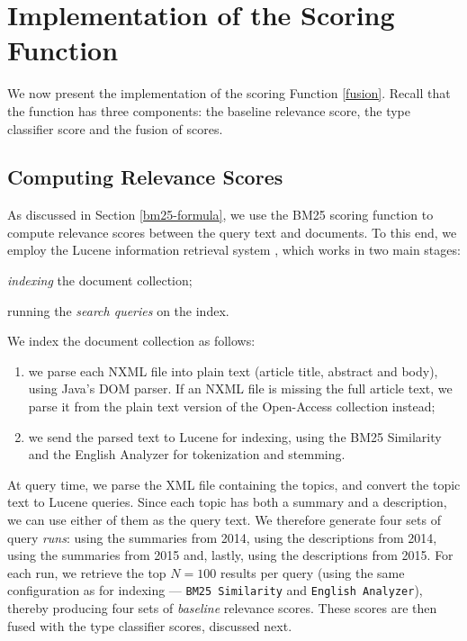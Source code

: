 \section{Implementation of the Scoring Function}
We now present the implementation of the scoring Function \ref{fusion}. Recall that the function has three components:
the baseline relevance score, the type classifier score and the fusion of scores.

\subsection{Computing Relevance Scores}\label{sim-impl}
As discussed in Section \ref{bm25-formula}, we use the \textsf{BM25} scoring function to compute relevance scores between the query
text and documents. To this end, we employ the Lucene information retrieval system \cite{lucene}, which works in two main stages:
\begin{enumerate*}[label=\arabic*)]
 \item \emph{indexing} the document collection;
 \item running the \emph{search queries} on the index.
\end{enumerate*}

We index the document collection as follows:
\begin{enumerate}[label=\arabic*)]
 \item we parse each NXML file into plain text (article title, abstract and body), using Java's DOM parser.
  If an NXML file is missing the full article text, we parse it from the plain text version of the Open-Access collection instead;
 \item we send the parsed text to Lucene for indexing,
    using the BM25 Similarity and the English Analyzer for tokenization and stemming.
\end{enumerate}

At query time, we parse the XML file containing the topics, and convert the topic text to Lucene queries.
Since each topic has both a summary and a description, we can use either of them as the query text.
We therefore
generate four sets of query \emph{runs}: using the summaries from 2014, using the descriptions from 2014, using the summaries from 2015 and,
lastly, using the descriptions from 2015.
For each run, we retrieve the top $N=100$ results per query
(using the same configuration as for indexing --- \texttt{BM25 Similarity} and \texttt{English Analyzer}),
thereby producing four sets of \emph{baseline} relevance scores.
These scores are then fused with the type classifier scores, discussed next.

